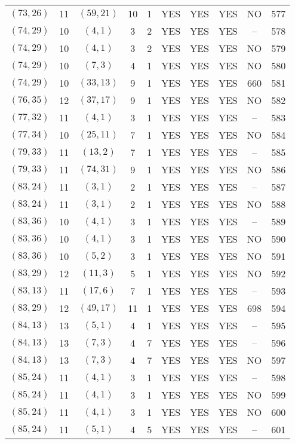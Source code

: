 \begin{longtable}{|c|c|c|c|c|c|c|c|c|c|}
$(73, 26)$ & 11 & $(59, 21)$ & 10 & 1 & YES & YES & YES & NO & 577\\
$(74, 29)$ & 10 & $(4, 1)$ & 3 & 2 & YES & YES & YES & -- & 578\\
$(74, 29)$ & 10 & $(4, 1)$ & 3 & 2 & YES & YES & YES & NO & 579\\
$(74, 29)$ & 10 & $(7, 3)$ & 4 & 1 & YES & YES & YES & NO & 580\\
$(74, 29)$ & 10 & $(33, 13)$ & 9 & 1 & YES & YES & YES & 660 & 581\\
$(76, 35)$ & 12 & $(37, 17)$ & 9 & 1 & YES & YES & YES & NO & 582\\
$(77, 32)$ & 11 & $(4, 1)$ & 3 & 1 & YES & YES & YES & -- & 583\\
$(77, 34)$ & 10 & $(25, 11)$ & 7 & 1 & YES & YES & YES & NO & 584\\
$(79, 33)$ & 11 & $(13, 2)$ & 7 & 1 & YES & YES & YES & -- & 585\\
$(79, 33)$ & 11 & $(74, 31)$ & 9 & 1 & YES & YES & YES & NO & 586\\
$(83, 24)$ & 11 & $(3, 1)$ & 2 & 1 & YES & YES & YES & -- & 587\\
$(83, 24)$ & 11 & $(3, 1)$ & 2 & 1 & YES & YES & YES & NO & 588\\
$(83, 36)$ & 10 & $(4, 1)$ & 3 & 1 & YES & YES & YES & -- & 589\\
$(83, 36)$ & 10 & $(4, 1)$ & 3 & 1 & YES & YES & YES & NO & 590\\
$(83, 36)$ & 10 & $(5, 2)$ & 3 & 1 & YES & YES & YES & NO & 591\\
$(83, 29)$ & 12 & $(11, 3)$ & 5 & 1 & YES & YES & YES & NO & 592\\
$(83, 13)$ & 11 & $(17, 6)$ & 7 & 1 & YES & YES & YES & -- & 593\\
$(83, 29)$ & 12 & $(49, 17)$ & 11 & 1 & YES & YES & YES & 698 & 594\\
$(84, 13)$ & 13 & $(5, 1)$ & 4 & 1 & YES & YES & YES & -- & 595\\
$(84, 13)$ & 13 & $(7, 3)$ & 4 & 7 & YES & YES & YES & -- & 596\\
$(84, 13)$ & 13 & $(7, 3)$ & 4 & 7 & YES & YES & YES & NO & 597\\
$(85, 24)$ & 11 & $(4, 1)$ & 3 & 1 & YES & YES & YES & -- & 598\\
$(85, 24)$ & 11 & $(4, 1)$ & 3 & 1 & YES & YES & YES & NO & 599\\
$(85, 24)$ & 11 & $(4, 1)$ & 3 & 1 & YES & YES & YES & NO & 600\\
$(85, 24)$ & 11 & $(5, 1)$ & 4 & 5 & YES & YES & YES & -- & 601\\

\end{longtable}
